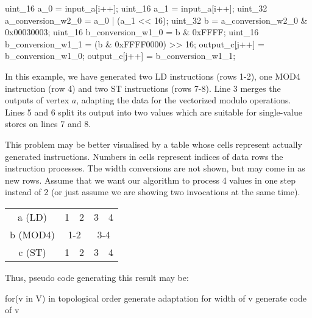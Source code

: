 
\mybeginfig
\begin{code}
uint_16 a_0 = input_a[i++];
uint_16 a_1 = input_a[i++];
uint_32 a_conversion_w2_0 = a_0 | (a_1 << 16);
uint_32 b = a_conversion_w2_0 & 0x00030003;
uint_16 b_conversion_w1_0 = b & 0xFFFF;
uint_16 b_conversion_w1_1 = (b & 0xFFFF0000) >> 16;
output_c[j++] = b_conversion_w1_0;
output_c[j++] = b_conversion_w1_1;
\end{code}

In this example, we have generated two LD instructions (rows 1-2), one MOD4 instruction (row 4) and two ST instructions (rows 7-8). Line 3 merges the outputs of vertex $a$, adapting the data for the vectorized modulo operations. Lines 5 and 6 split its output into two values which are suitable for single-value stores on lines 7 and 8.


This problem may be better visualised by a table whose cells represent actually generated instructions. Numbers in cells represent indices of data rows the instruction processes. The width conversions are not shown, but may come in as new rows. Assume that we want our algorithm to process 4 values in one step instead of 2 (or just assume we are showing two invocations at the same time).

\mybeginfig
\begin{center}
\begin{tabular}{c|c|c|c|c|}
  \cline{2-5}
a (LD) & 1 & 2 & 3 & 4\\
  \cline{2-5}
b (MOD4) & \multicolumn{2}{c|}{1-2} & \multicolumn{2}{c|}{3-4}\\
  \cline{2-5}
c (ST) & 1 & 2 & 3 & 4\\
  \cline{2-5}
\end{tabular}
\end{center}



Thus, pseudo code generating this result may be:

\begin{code}
for(v in V) in topological order
{
  generate adaptation for width of v
  generate code of v
}
\end{code}

